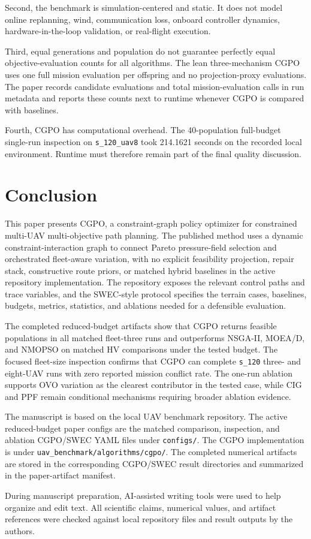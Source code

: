 \documentclass[a4paper,fleqn]{cas-dc}
\begin{document}
Second, the benchmark is simulation-centered and static. It does not model online replanning, wind, communication loss, onboard controller dynamics, hardware-in-the-loop validation, or real-flight execution.

Third, equal generations and population do not guarantee perfectly equal objective-evaluation counts for all algorithms. The lean three-mechanism CGPO uses one full mission evaluation per offspring and no projection-proxy evaluations. The paper records candidate evaluations and total mission-evaluation calls in run metadata and reports these counts next to runtime whenever CGPO is compared with baselines.

Fourth, CGPO has computational overhead. The 40-population full-budget single-run inspection on \texttt{s\_120\_uav8} took 214.1621 seconds on the recorded local environment. Runtime must therefore remain part of the final quality discussion.

\section{Conclusion}
\label{sec:conclusion}

This paper presents CGPO, a constraint-graph policy optimizer for constrained multi-UAV multi-objective path planning. The published method uses a dynamic constraint-interaction graph to connect Pareto pressure-field selection and orchestrated fleet-aware variation, with no explicit feasibility projection, repair stack, constructive route priors, or matched hybrid baselines in the active repository implementation. The repository exposes the relevant control paths and trace variables, and the SWEC-style protocol specifies the terrain cases, baselines, budgets, metrics, statistics, and ablations needed for a defensible evaluation.

The completed reduced-budget artifacts show that CGPO returns feasible populations in all matched fleet-three runs and outperforms NSGA-II, MOEA/D, and NMOPSO on matched HV comparisons under the tested budget. The focused fleet-size inspection confirms that CGPO can complete \texttt{s\_120} three- and eight-UAV runs with zero reported mission conflict rate. The one-run ablation supports OVO variation as the clearest contributor in the tested case, while CIG and PPF remain conditional mechanisms requiring broader ablation evidence.

The manuscript is based on the local UAV benchmark repository. The active reduced-budget paper configs are the matched comparison, inspection, and ablation CGPO/SWEC YAML files under \texttt{configs/}. The CGPO implementation is under \texttt{uav\_benchmark/algorithms/cgpo/}. The completed numerical artifacts are stored in the corresponding CGPO/SWEC result directories and summarized in the paper-artifact manifest.

During manuscript preparation, AI-assisted writing tools were used to help organize and edit text. All scientific claims, numerical values, and artifact references were checked against local repository files and result outputs by the authors.



\end{document}
